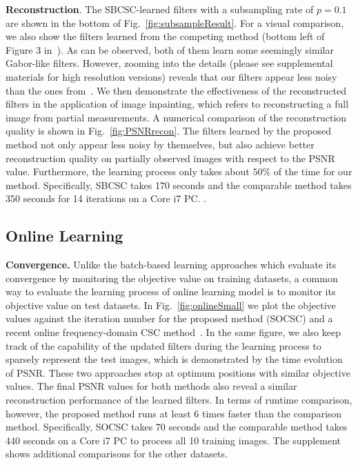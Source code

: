 {\bfseries Reconstruction}. The SBCSC-learned filters with a
subsampling rate of $p=0.1$ are shown in the bottom of
Fig.~\ref{fig:subsampleResult}. For a visual comparison, we also show
the filters learned from the competing method (bottom left of Figure 3
in~\cite{heide2015fast}). As can be observed, both of them learn some
seemingly similar Gabor-like filters. However, zooming into the
details (please see supplemental materials for high resolution
versions) reveals that our filters appear less noisy than the ones
from~\cite{heide2015fast}. We then demonstrate the effectiveness of
the reconstructed filters in the application of image inpainting,
which refers to reconstructing a full image from partial
measurements. A numerical comparison of the reconstruction quality is
shown in Fig.~\ref{fig:PSNRrecon}. The filters learned by the proposed
method not only appear less noisy by themselves, but also achieve
better reconstruction quality on partially observed images with
respect to the PSNR value. Furthermore, the learning process
only takes about $50\%$ of the time for our method. Specifically, SBCSC takes 170 seconds and the comparable method takes 350 seconds for 14 iterations on a Core i7 PC. .

\subsection{Online Learning}

{\bfseries Convergence.} Unlike the batch-based learning approaches
which evaluate its convergence by monitoring the objective value on
training datasets, a common way to evaluate the learning process of
online learning model is to monitor its objective value on test
datasets. In Fig.~\ref{fig:onlineSmall} we plot the objective values
against the iteration number for the proposed method (SOCSC) and a
recent online frequency-domain CSC method~\cite{liu-2018-first}. In
the same figure, we also keep track of the capability of the updated
filters during the learning process to sparsely represent the test
images, which is demonstrated by the time evolution of PSNR. These two
approaches stop at optimum positions with similar objective values.
The final PSNR values for both methods also reveal a similar
reconstruction performance of the learned filters. In terms of runtime
comparison, however, the proposed method runs at least $6$ times faster
than the comparison method. Specifically, SOCSC takes 70 seconds and the comparable method takes 440 seconds on a Core i7 PC to process all 10 training images. The supplement shows additional comparisons for the other datasets.


